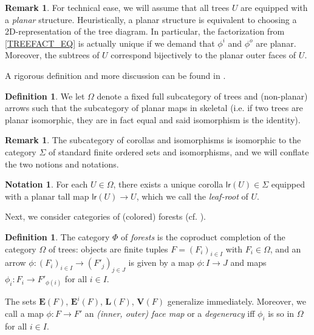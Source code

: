 \documentclass[a4paper,10pt
,draft
]{article}%
\numberwithin{equation}{section}
\numberwithin{figure}{section}
\theoremstyle{definition} %
\newtheorem{definition}[equation]{Definition}%
\newtheorem{remark}[equation]{Remark}%
\newtheorem{notation}[equation]{Notation}%
\newcommand{\1}{\ensuremath{\mathbbm 1}}%
\begin{document}
\begin{remark}
      For technical ease, we will assume that all trees $U$ are equipped with a \textit{planar} structure.
      Heuristically, a planar structure is equivalent to choosing a 2D-representation of the tree diagram.
      In particular, the factorization from \eqref{TREEFACT_EQ} is actually unique if we demand that $\phi^i$ and $\phi^o$ are planar.
      Moreover, the subtrees of $U$ correspond bijectively to the planar outer faces of $U$.
      
      A rigorous definition and more discussion can be found in \cite[\S 3.1]{BP_geo}.
\end{remark}

\begin{definition}
      We let $\Omega$ denote a fixed full subcategory of trees and (non-planar) arrows
      such that the subcategory of planar maps in skeletal (i.e. if two trees are planar isomorphic, they are in fact equal and said isomorphism is the identity).
\end{definition}

\begin{remark}
      The subcategory of corollas and isomorphisms is isomorphic to the category $\Sigma$ of standard finite ordered sets and isomorphisms,
      and we will conflate the two notions and notations.
\end{remark}

\begin{notation}
      \label{LR_NOT}
      For each $U \in \Omega$, there exists a unique corolla $\mathsf{lr}(U) \in \Sigma$ equipped with a planar tall map $\mathsf{lr}(U) \to U$,
      which we call the \textit{leaf-root} of $U$.
\end{notation}


Next, we consider categories of (colored) forests (cf. \cite[Defn. 2.56]{BP_HGOP}).

\begin{definition}
      The category $\Phi$ of \textit{forests} is the coproduct completion of the category $\Omega$ of trees:
      objects are finite tuples $F = (F_i)_{i \in I}$ with $F_i \in \Omega$,
      and an arrow $\phi \colon (F_i)_{i \in I} \to (F'_j)_{j \in J}$ is given by
      a map $\phi \colon I \to J$ and
      maps $\phi_i \colon F_i \to F'_{\phi(i)}$ for all $i \in I$.
     
      The sets $\boldsymbol{E}(F)$, $\boldsymbol{E}^i(F)$, $\boldsymbol{L}(F)$, $\boldsymbol{V}(F)$ generalize immediately.
      Moreover, we call a map $\phi \colon F \to F'$ an \textit{(inner, outer) face map} or a \textit{degeneracy} iff
      $\phi_i$ is so in $\Omega$ for all $i \in I$.
\end{definition}
\end{document}

